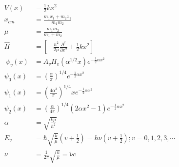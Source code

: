 \begin{align*}
V\left(x\right)&=\frac{1}{2}kx^2\\
x_{cm}&=\frac{m_1x_1+m_2x_2}{m_1m_2}\\
\mu&=\frac{m_1m_2}{m_1+m_2}\\
\hat{H}&=\left[-\frac{\hbar^2}{2\mu} \frac{\partial^2}{\partial x^2}+ \frac{1}{2}kx^2\right]\\\
\psi_v\left(x\right)&=A_vH_v\left(\alpha^{1/2}x\right)e^{-\frac{1}{2}\alpha x^2}\\
\psi_0\left(x\right)&=\left(\frac{\alpha}{\pi}\right)^{1/4}e^{-\frac{1}{2}\alpha x^2}\\
\psi_1\left(x\right)&=\left(\frac{4\alpha^3}{\pi}\right)^{1/4}xe^{-\frac{1}{2}\alpha x^2}\\
\psi_2\left(x\right)&=\left(\frac{\alpha}{4\pi}\right)^{1/4}\left(2\alpha x^2-1\right)e^{-\frac{1}{2}\alpha x^2}\\
\alpha&=\sqrt{\frac{k\mu}{\hbar^2}}\\
E_v&=\hbar\sqrt{\frac{k}{\mu}}\left(v+\frac{1}{2}\right)=h\nu\left(v+\frac{1}{2}\right); v = 0, 1, 2, 3, \cdots\\
\nu&=\frac{1}{2\pi}\sqrt{\frac{k}{\mu}}=\tilde{\nu}c\\
\end{align*}

